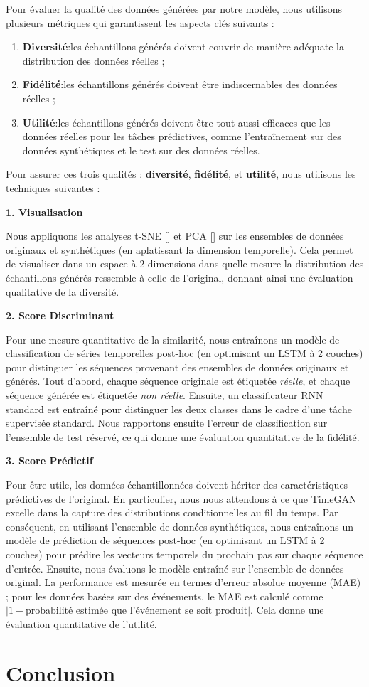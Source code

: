 Pour évaluer la qualité des données générées par notre modèle, nous utilisons plusieurs métriques qui garantissent les aspects clés suivants :
\begin{enumerate}
    \item \textbf{Diversité}:les échantillons générés doivent couvrir de manière adéquate la distribution des données réelles ;
    \item \textbf{Fidélité}:les échantillons générés doivent être indiscernables des données réelles ;
    \item \textbf{Utilité}:les échantillons générés doivent être tout aussi efficaces que les données réelles pour les tâches prédictives, comme l'entraînement sur des données synthétiques et le test sur des données réelles.
\end{enumerate}

Pour assurer ces trois qualités : \textbf{diversité}, \textbf{fidélité}, et \textbf{utilité}, nous utilisons les techniques suivantes :

\textbf{1. Visualisation}

Nous appliquons les analyses t-SNE [\cite{van2008visualizing}] et PCA [\cite{wold1987principal}] sur les ensembles de données originaux et synthétiques (en aplatissant la dimension temporelle). Cela permet de visualiser dans un espace à 2 dimensions dans quelle mesure la distribution des échantillons générés ressemble à celle de l'original, donnant ainsi une évaluation qualitative de la diversité.

\textbf{2. Score Discriminant}

Pour une mesure quantitative de la similarité, nous entraînons un modèle de classification de séries temporelles post-hoc (en optimisant un LSTM à 2 couches) pour distinguer les séquences provenant des ensembles de données originaux et générés. Tout d'abord, chaque séquence originale est étiquetée \textit{réelle}, et chaque séquence générée est étiquetée \textit{non réelle}. Ensuite, un classificateur RNN standard est entraîné pour distinguer les deux classes dans le cadre d'une tâche supervisée standard. Nous rapportons ensuite l'erreur de classification sur l'ensemble de test réservé, ce qui donne une évaluation quantitative de la fidélité.

\textbf{3. Score Prédictif}

Pour être utile, les données échantillonnées doivent hériter des caractéristiques prédictives de l'original. En particulier, nous nous attendons à ce que TimeGAN excelle dans la capture des distributions conditionnelles au fil du temps. Par conséquent, en utilisant l'ensemble de données synthétiques, nous entraînons un modèle de prédiction de séquences post-hoc (en optimisant un LSTM à 2 couches) pour prédire les vecteurs temporels du prochain pas sur chaque séquence d'entrée. Ensuite, nous évaluons le modèle entraîné sur l'ensemble de données original. La performance est mesurée en termes d'erreur absolue moyenne (MAE) ; pour les données basées sur des événements, le MAE est calculé comme $|1 - \text{probabilité estimée que l'événement se soit produit}|$. Cela donne une évaluation quantitative de l'utilité.

\section{Conclusion}
